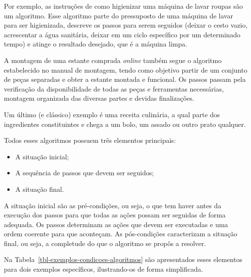 \documentclass[
  11pt,
  a4paper,
]{scrbook}
\providecommand{\tightlist}{%
  \setlength{\itemsep}{0pt}\setlength{\parskip}{0pt}}\usepackage{longtable,booktabs,array}
\begin{document}
Por exemplo, as instruções de como higienizar uma máquina de lavar
roupas são um algoritmo. Esse algoritmo parte do pressuposto de uma
máquina de lavar para ser higienizada, descreve os passos para serem
seguidos (deixar o cesto vazio, acrescentar a água sanitária, deixar em
um ciclo específico por um determinado tempo) e atinge o resultado
desejado, que é a máquina limpa.

A montagem de uma estante comprada \emph{online} também segue o
algoritmo estabelecido no manual de montagem, tendo como objetivo partir
de um conjunto de peças separadas e obter a estante montada e funcional.
Os passos passam pela verificação da disponibilidade de todas as peças e
ferramentas necessárias, montagem organizada das diversas partes e
devidas finalizações.

Um último (e clássico) exemplo é uma receita culinária, a qual parte dos
ingredientes constituintes e chega a um bolo, um assado ou outro prato
qualquer.

Todos esses algoritmos possuem três elementos principais:

\begin{itemize}
\tightlist
\item
  A situação inicial;
\item
  A sequência de passos que devem ser seguidos;
\item
  A situação final.
\end{itemize}

  A situação inicial são as
pré-condições, ou seja, o que tem haver antes da execução dos passos
para que todas as ações possam ser seguidas de forma adequada. Os passos
determinam as ações que devem ser executadas e uma ordem coerente para
que aconteçam. As pós-condições caracterizam a situação final, ou seja,
a completude do que o algoritmo se propôs a resolver.

Na Tabela~\ref{tbl-exemplos-condicoes-algoritmos} são apresentados esses
elementos para dois exemplos específicos, ilustrando-os de forma
simplificada.
\end{document}
